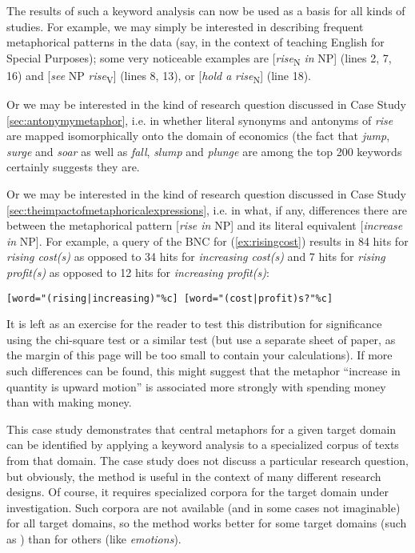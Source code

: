 The results of such a keyword analysis can now be used as a basis for all kinds of studies. For example, we may simply be interested in describing frequent metaphorical patterns in the data (say, in the context of teaching English for Special Purposes); some very noticeable examples are [\textit{rise}\textsubscript{N} \textit{in} NP] (lines 2, 7, 16) and [\textit{see} NP \textit{rise}\textsubscript{V}] (lines 8, 13), or [\textit{hold a} \textit{rise}\textsubscript{N}] (line 18).

Or we may be interested in the kind of research question discussed in Case Study \ref{sec:antonymymetaphor}, i.e. in whether literal synonyms and antonyms of \textit{rise} are mapped isomorphically onto the domain of economics (the fact that \textit{jump}, \textit{surge} and \textit{soar} as well as \textit{fall}, \textit{slump} and \textit{plunge} are among the top 200 keywords certainly suggests they are.

Or we may be interested in the kind of research question discussed in Case Study \ref{sec:theimpactofmetaphoricalexpressions}, i.e. in what, if any, differences there are between the metaphorical pattern [\textit{rise in} NP] and its literal equivalent [\textit{increase in} NP]. For example, a query of the BNC for (\ref{ex:risingcost}) results in 84 hits for \textit{rising cost(s)} as opposed to 34 hits for \textit{increasing cost(s)} and 7 hits for \textit{rising profit(s)} as opposed to 12 hits for \textit{increasing profit(s)}:

\begin{exe}
\ex \texttt{[word="(rising|increasing)"\%c] [word="(cost|profit)s?"\%c]}
\label{ex:risingcost}
\end{exe}


It is left as an exercise for the reader to test this distribution for significance using the chi-square test or a similar test (but use a separate sheet of paper, as the margin of this page will be too small to contain your calculations). If more such differences can be found, this might suggest that the metaphor ``increase in quantity is upward motion'' is associated more strongly with spending money than with making money.

This case study demonstrates that central metaphors for a given target domain can be identified by applying a keyword analysis to a specialized corpus of texts from that domain. The case study does not discuss a particular research question, but obviously, the method is useful in the context of many different research designs. Of course, it requires specialized corpora for the target domain under investigation. Such corpora are not available (and in some cases not imaginable) for all target domains, so the method works better for some target domains (such as ) than for others (like \textit{emotions}).

